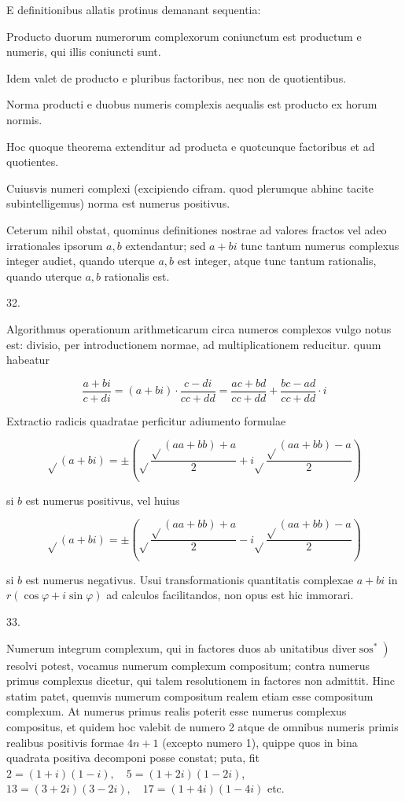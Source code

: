 \documentclass[10pt]{article}
\begin{document}
E definitionibus allatis protinus demanant sequentia:

Producto duorum numerorum complexorum coniunctum est productum e numeris, qui illis coniuncti sunt.

Idem valet de producto e pluribus factoribus, nec non de quotientibus.

Norma producti e duobus numeris complexis aequalis est producto ex horum normis.

Hoc quoque theorema extenditur ad producta e quotcunque factoribus et ad quotientes.

Cuiusvis numeri complexi (excipiendo cifram. quod plerumque abhinc tacite subintelligemus) norma est numerus positivus.

Ceterum nihil obstat, quominus definitiones nostrae ad valores fractos vel adeo irrationales ipsorum \(a, b\) extendantur; sed \(a+b i\) tunc tantum numerus complexus integer audiet, quando uterque \(a, b\) est integer, atque tunc tantum rationalis, quando uterque \(a, b\) rationalis est.

32.

Algorithmus operationum arithmeticarum circa numeros complexos vulgo notus est: divisio, per introductionem normae, ad multiplicationem reducitur. quum habeatur

\[
\frac{a+b i}{c+d i}=(a+b i) \cdot \frac{c-d i}{c c+d d}=\frac{a c+b d}{c c+d d}+\frac{b c-a d}{c c+d d} \cdot i
\]

Extractio radicis quadratae perficitur adiumento formulae

\[
\sqrt{ }(a+b i)= \pm\left(\sqrt{ } \frac{\sqrt{ }(a a+b b)+a}{2}+i \sqrt{ } \frac{\sqrt{ }(a a+b b)-a}{2}\right)
\]

si \(b\) est numerus positivus, vel huius

\[
\sqrt{ }(a+b i)= \pm\left(\sqrt{ } \frac{\sqrt{ }(a a+b b)+a}{2}-i \sqrt{ } \frac{\sqrt{ }(a a+b b)-a}{2}\right)
\]

si \(b\) est numerus negativus. Usui transformationis quantitatis complexae \(a+b i\) in \(r(\cos \varphi+i \sin \varphi)\) ad calculos facilitandos, non opus est hic immorari.

33.

Numerum integrum complexum, qui in factores duos ab unitatibus diver\(\left.\operatorname{sos}^{*}\right)\) resolvi potest, vocamus numerum complexum compositum; contra numerus primus complexus dicetur, qui talem resolutionem in factores non admittit. Hinc statim patet, quemvis numerum compositum realem etiam esse compositum complexum. At numerus primus realis poterit esse numerus complexus compositus, et quidem hoc valebit de numero 2 atque de omnibus numeris primis realibus positivis formae \(4 n+1\) (excepto numero 1), quippe quos in bina quadrata positiva decomponi posse constat; puta, fit \(2=(1+i)(1-i), \quad 5=(1+2 i)(1-2 i)\), \(13=(3+2 i)(3-2 i), \quad 17=(1+4 i)(1-4 i)\) etc.
\end{document}
